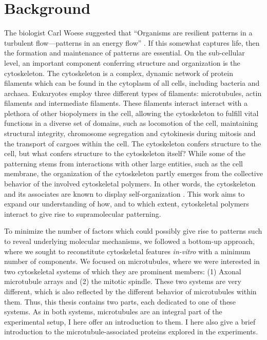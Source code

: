 \chapter{Background}
The biologist Carl Woese suggested that “Organisms are resilient patterns in a turbulent flow—patterns in an energy flow” \parencite{Woese}. If this somewhat captures life, then the formation and maintenance of patterns are essential. On the sub-cellular level, an important component conferring structure and organization is the cytoskeleton. The cytoskeleton is a complex, dynamic network of protein filaments which can be found in the cytoplasm of all cells, including bacteria and archaea. Eukaryotes employ three different types of filaments: microtubules, actin filaments and intermediate filaments. These filaments interact interact with a plethora of other biopolymers in the cell, allowing the cytoskeleton to fulfill vital functions in a diverse set of domains, such as locomotion of the cell, maintaining structural integrity, chromosome segregation and cytokinesis during mitosis and the transport of cargoes within the cell. The cytoskeleton confers structure to the cell, but what confers structure to the cytoskeleton itself? While some of the patterning stems from interactions with other large entities, such as the cell membrane, the organization of the cytoskeleton partly emerges from the collective behavior of the involved cytoskeletal polymers. In other words, the cytoskeleton and its associates are known to display self-organization \parencite{Karsenti2008}. This work aims to expand our understanding of how, and to which extent, cytoskeletal polymers interact to give rise to supramolecular patterning. \par
To minimize the number of factors which could possibly give rise to patterns such to reveal underlying molecular mechanisms, we followed a bottom-up approach, where we sought to reconstitute cytoskeletal features \textit{in-vitro} with a minimum number of components. We focused on microtubules, where we were interested in two cytoskeletal systems of which they are prominent members: (1) Axonal microtubule arrays and (2) the mitotic spindle. These two systems are very different, which is also reflected by the different behavior of microtubules within them. Thus, this thesis contains two parts, each dedicated to one of these systems. As in both systems, microtubules are an integral part of the experimental setup, I here offer an introduction to them. I here also give a brief introduction to the microtubule-associated proteins explored in the experiments.

